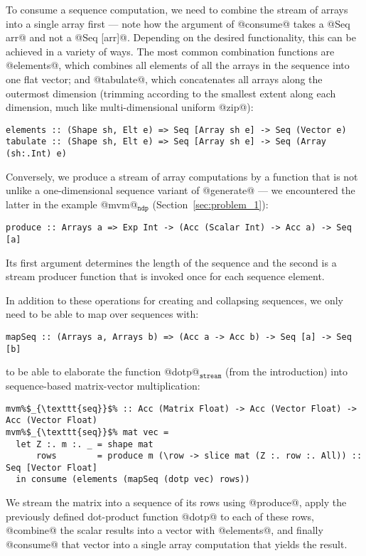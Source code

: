 To consume a sequence computation, we need to combine the stream of arrays into a single array first --- note how the argument of @consume@ takes a @Seq arr@ and not a @Seq [arr]@. Depending on the desired functionality, this can be achieved in a variety of ways. The most common combination functions are @elements@, which combines all elements of all the arrays in the sequence into one flat vector; and @tabulate@, which concatenates all arrays along the outermost dimension (trimming according to the smallest extent along each dimension, much like multi-dimensional uniform @zip@):
%
\begin{lstlisting}
elements :: (Shape sh, Elt e) => Seq [Array sh e] -> Seq (Vector e)
tabulate :: (Shape sh, Elt e) => Seq [Array sh e] -> Seq (Array (sh:.Int) e)
\end{lstlisting}

Conversely, we produce a stream of array computations by a function that is not unlike a one-dimensional sequence variant of @generate@ --- we encountered the latter in the example @mvm@$_{\mathtt{ndp}}$ (Section~\ref{sec:problem_1}):
%
\begin{lstlisting}
produce :: Arrays a => Exp Int -> (Acc (Scalar Int) -> Acc a) -> Seq [a]
\end{lstlisting}
%
Its first argument determines the length of the sequence and the second is a stream producer function that is invoked once for each sequence element.

In addition to these operations for creating and collapsing sequences, we only need to be able to map over sequences with:
%
\begin{lstlisting}
mapSeq :: (Arrays a, Arrays b) => (Acc a -> Acc b) -> Seq [a] -> Seq [b]
\end{lstlisting}
%
to be able to elaborate the function @dotp@$_\texttt{stream}$ (from the introduction) into sequence-based matrix-vector multiplication:
%
\begin{lstlisting}
mvm%$_{\texttt{seq}}$% :: Acc (Matrix Float) -> Acc (Vector Float) -> Acc (Vector Float)
mvm%$_{\texttt{seq}}$% mat vec =
  let Z :. m :. _ = shape mat
      rows        = produce m (\row -> slice mat (Z :. row :. All)) :: Seq [Vector Float]
  in consume (elements (mapSeq (dotp vec) rows))
\end{lstlisting}
%
We stream the matrix into a sequence of its rows using @produce@, apply the previously defined dot-product function @dotp@ to each of these rows, @combine@ the scalar results into a vector with @elements@, and finally @consume@ that vector into a single array computation that yields the result.

